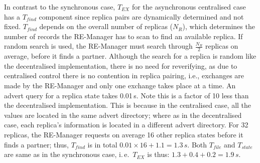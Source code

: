 \documentclass{rspublic}
\newcommand{\alnote}[1]{ {\textcolor{blue} { ***andre: #1 }}}
\newcommand{\athotanote}[1]{ {\textcolor{green} { ***athota: #1 }}}
\newcommand{\alnote}[1]{}
\newcommand{\athotanote}[1]{}
\begin{document}




In contrast to the synchronous case, $T_{EX}$ for the asynchronous
centralised case has a $T_{find}$ component since replica pairs are
dynamically determined and not fixed. $T_{find}$ depends on the overall
number of replicas ($N_R$), which determines the number of records the
RE-Manager has to scan to find an available replica. If random search is used,
the RE-Manager must search through $\frac{N_R}{2}$ replicas on average, before it
finds a partner. Although the search for a replica is random like the
decentralised implementation, there is no need for reverifying, as due
to centralised control there is no contention in replica pairing,
i.e., exchanges are made by the RE-Manager and only one exchange takes
place at a time.  An advert query for a replica state takes
0.01\,s. Note this is a factor of 10 less than the decentralised
implementation. This is because in the centralised case, all the values are located in the same advert directory; where as in the decentralised case, each replica's information is located in a different advert directory.  %
For 32 replicas, the RE-Manager requests on average 16 other replica
states before it finds a partner; thus, $T_{find}$ is in total
$0.01\times16+1.1=1.3\,s$. Both $T_{file}$ and $T_{state}$ are same as
in the synchronous case, i.\,e.\ $T_{EX}$ is thus:
$1.3+0.4+0.2=1.9\,s$.
\end{document}
